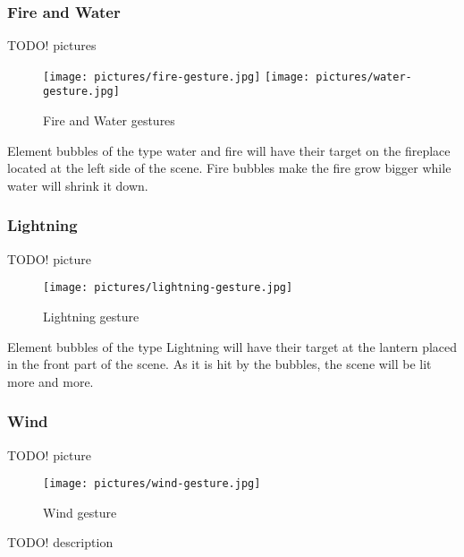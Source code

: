 \subsubsection{Fire and Water}
TODO! pictures\\
\begin{figure}[!ht]
\texttt{[image: pictures/fire-gesture.jpg]}
\texttt{[image: pictures/water-gesture.jpg]}
\caption{Fire and Water gestures}
\end{figure}

Element bubbles of the type water and fire will have their target on the fireplace located at the left side of the scene. Fire bubbles make the fire grow bigger while water will shrink it down.

\subsubsection{Lightning}
TODO! picture\\
\begin{figure}[!ht]
\texttt{[image: pictures/lightning-gesture.jpg]}
\caption{Lightning gesture}
\end{figure}

Element bubbles of the type Lightning will have their target at the lantern placed in the front part of the scene. As it is hit by the bubbles, the scene will be lit more and more.

\subsubsection{Wind}
TODO! picture\\
\begin{figure}[!ht]
\texttt{[image: pictures/wind-gesture.jpg]}
\caption{Wind gesture}
\end{figure}
TODO! description\\